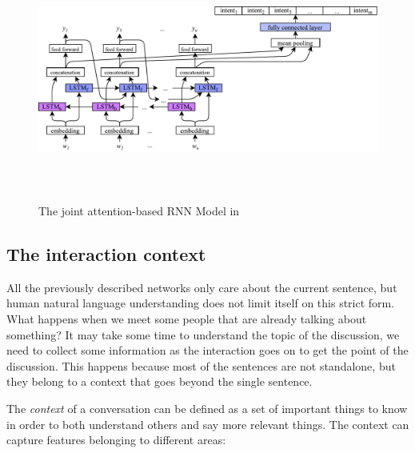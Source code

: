\begin{figure}[!htbp]
    \centering
    \includegraphics[max width=\linewidth,max height=8cm,keepaspectratio]{figures/jointSLUrnn}
    \caption{The joint attention-based RNN Model in~\cite{liu2016attention}}\label{fig:jointSLUrnn}
\end{figure}

\subsection{The interaction context}
\label{soaInteractionContext}

All the previously described networks only care about the current sentence, but human natural language understanding does not limit itself on this strict form. What happens when we meet some people that are already talking about something? It may take some time to understand the topic of the discussion, we need to collect some information as the interaction goes on to get the point of the discussion. This happens because most of the sentences are not standalone, but they belong to a context that goes beyond the single sentence.

The \textit{context} of a conversation can be defined as a set of important things to know in order to both understand others and say more relevant things. The context can capture features belonging to different areas:

